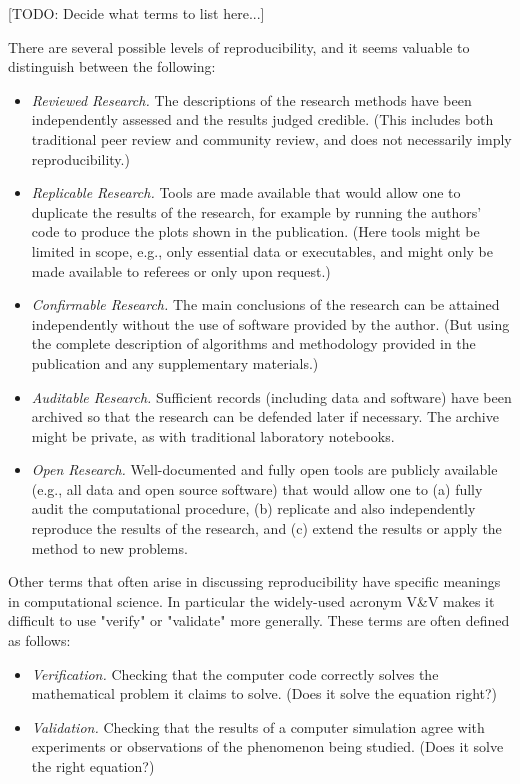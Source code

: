 \documentclass[11pt]{article}
\newcommand{\todo}[1]{{\color{red} [TODO: #1]}}
\newcommand{\todo}[1]{}
\begin{document}
\todo{Decide what terms to list here...}

There are several possible levels of reproducibility, and it seems valuable
to distinguish between the following:

\begin{itemize} 
\item {\em Reviewed Research.} The descriptions of the research methods have been
independently assessed and the results judged credible. (This includes both
traditional peer review and community review, and does not necessarily imply
reproducibility.)

\item {\em Replicable Research.}  Tools are made available that would allow one to
duplicate the results of the research, for example by running the authors'
code to produce the plots shown in the publication. (Here tools might be
limited in scope, e.g., only essential data or executables, and might only
be made available to referees or only upon request.)

\item {\em Confirmable Research.} The main conclusions of the research can be attained
independently without the use of software provided by the author. (But using
the complete description of algorithms and methodology provided in the
publication and any supplementary materials.)

\item {\em Auditable Research.}  Sufficient records (including data and software) have
been archived so that the research can be defended later if necessary.  The
archive might be private, as with traditional laboratory notebooks.

\item {\em Open Research.}  Well-documented and fully open tools are publicly available
(e.g., all data and open source software) that would allow one to (a) fully
audit the computational procedure, (b) replicate and also independently
reproduce the results of the research, and 
(c) extend the results or apply the method to new problems.

\end{itemize} 


Other terms that often arise in discussing reproducibility have specific
meanings in computational science.  In particular the widely-used acronym
V\&V makes it difficult to use "verify" or "validate" more generally.  These
terms are often defined as follows: 

\begin{itemize} 
\item {\em Verification.}  Checking that the computer code correctly solves the
mathematical problem it claims to solve. (Does it solve the equation right?)

\item {\em Validation.}  Checking that the results of a computer simulation agree with
experiments or observations of the phenomenon being studied.  (Does it solve
the right equation?)
\end{itemize} 
\end{document}
